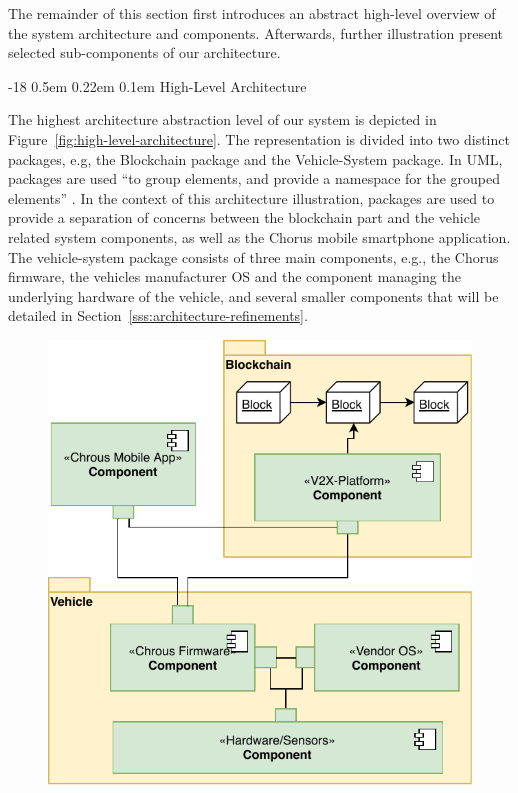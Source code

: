 \documentclass{llncs}
\makeatletter
\renewcommand\subsubsection{\@startsection{subsubsection}{3}{\z@}%
		{-18\p@ \@plus -4\p@ \@minus -4\p@}%
		{0.5em \@plus 0.22em \@minus 0.1em}%
		{\normalfont\normalsize\bfseries\boldmath}}
\makeatother
\begin{document}
{			The remainder of this section first introduces an abstract high-level overview of the system architecture and components. Afterwards, further illustration present selected sub-components of our architecture.



			\subsubsection{High-Level Architecture}
				\label{sss:high-level-architecture}
				
				The highest architecture abstraction level of our system is depicted in Figure~\ref{fig:high-level-architecture}. The representation is divided into two distinct packages, e.g, the Blockchain package and the Vehicle-System package. In UML, packages are used “to group elements, and provide a namespace for the grouped elements”  \cite{specification2007omg}. In the context of this architecture illustration, packages are used to provide a separation of concerns between the blockchain part and the vehicle related system components, as well as the Chorus mobile smartphone application. The vehicle-system package consists of three main components, e.g., the Chorus firmware, the vehicles manufacturer OS and the component managing the underlying hardware of the vehicle, and several smaller components that will be detailed in Section~\ref{sss:architecture-refinements}.
				\begin{figure}[H]
					\centering
					\includegraphics[scale=0.75]{Figures/longterm-architecture/20180507_high-level-architecture.pdf}

\end{figure}}
\end{document}

